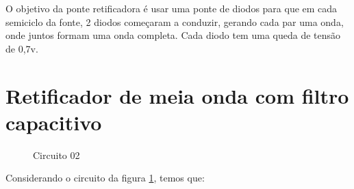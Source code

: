 O objetivo da ponte retificadora é usar uma ponte de diodos para que em cada semiciclo da fonte, 2 diodos começaram a conduzir, gerando cada par uma onda, onde juntos formam uma onda completa. Cada diodo tem uma queda de tensão de 0,7v.

\section{Retificador de meia onda com filtro capacitivo}

\begin{figure}[H]
    \centering
    \caption{Circuito 02}
    \vspace{-0.3cm}
    \label{fig:Circuito02}
\end{figure}

Considerando o circuito da figura \ref{fig:Circuito02}, temos que:

\begin{Resolucao}[H]
    \label{res:circuito02}
\end{Resolucao}


